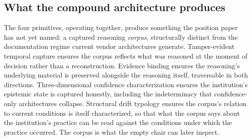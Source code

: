 %
%
%


\subsection{What the compound architecture produces}
\label{sec:primitives:compound-produces}

The four primitives, operating together, produce something the position paper has not yet named: a captured reasoning \emph{corpus}, structurally distinct from the documentation regime current vendor architectures generate. Tamper-evident temporal capture ensures the corpus reflects what was reasoned at the moment of decision rather than a reconstruction. Evidence binding ensures the reasoning's underlying material is preserved alongside the reasoning itself, traversable in both directions. Three-dimensional confidence characterization ensures the institution's epistemic state is captured honestly, including the indeterminacy that confidence-only architectures collapse. Structural drift typology ensures the corpus's relation to current conditions is itself characterized, so that what the corpus says about the institution's practice can be read against the conditions under which the practice occurred. The corpus is what the empty chair can later inspect.

